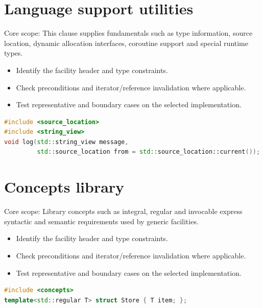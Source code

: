 \documentclass[11pt]{article}
\begin{document}
\section{Language support utilities}
Core scope: This clause supplies fundamentals such as type information, source location, dynamic allocation interfaces, coroutine support and special runtime types.

\begin{itemize}[leftmargin=*,itemsep=1pt,topsep=3pt]
\item Identify the facility header and type constraints.
\item Check preconditions and iterator/reference invalidation where applicable.
\item Test representative and boundary cases on the selected implementation.
\end{itemize}
\begin{lstlisting}[language=C++]
#include <source_location>
#include <string_view>
void log(std::string_view message,
         std::source_location from = std::source_location::current());
\end{lstlisting}
\section{Concepts library}
Core scope: Library concepts such as integral, regular and invocable express syntactic and semantic requirements used by generic facilities.

\begin{itemize}[leftmargin=*,itemsep=1pt,topsep=3pt]
\item Identify the facility header and type constraints.
\item Check preconditions and iterator/reference invalidation where applicable.
\item Test representative and boundary cases on the selected implementation.
\end{itemize}
\begin{lstlisting}[language=C++]
#include <concepts>
template<std::regular T> struct Store { T item; };
\end{lstlisting}
\end{document}

